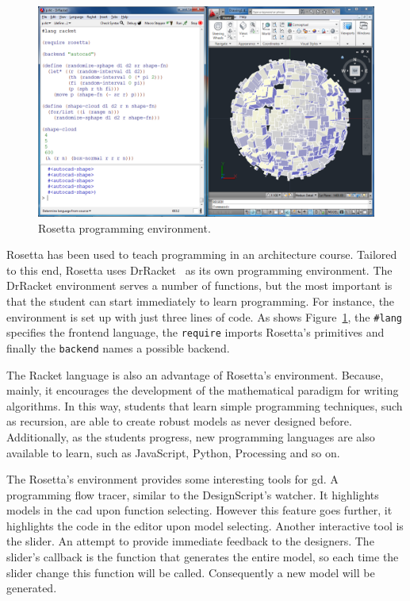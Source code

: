 \begin{figure}[!htbp]
  \centering
  \includegraphics[width=1.0\textwidth]{img/rosetta1}
    \caption{Rosetta programming environment.}  
  \label{fig:rosetta}
\end{figure} 

Rosetta has been used to teach programming in an architecture course. Tailored to this end, Rosetta uses DrRacket~\cite{findler2002drscheme} as its own programming environment. The DrRacket environment serves a number of functions, but the most important is that the student can start immediately to learn programming. For instance, the environment is set up with just three lines of code. As shows Figure~\ref{fig:rosetta}, the \texttt{\#lang} specifies the frontend language, the \texttt{require} imports Rosetta's primitives and finally the \texttt{backend} names a possible backend.

The Racket language is also an advantage of Rosetta's environment. Because, mainly, it encourages the development of the mathematical paradigm for writing algorithms. In this way, students that learn simple programming techniques, such as recursion, are able to create robust models as never designed before. Additionally, as the students progress, new programming languages are also available to learn, such as JavaScript, Python, Processing and so on.

The Rosetta's environment provides some interesting tools for \ac{gd}. A programming flow tracer, similar to the DesignScript's watcher. It highlights models in the \ac{cad} upon function selecting. However this feature goes further, it highlights the code in the editor upon model selecting. Another interactive tool is the slider. An attempt to provide immediate feedback to the designers. The slider's callback is the function that generates the entire model, so each time the slider change this function will be called. Consequently a new model will be generated.

